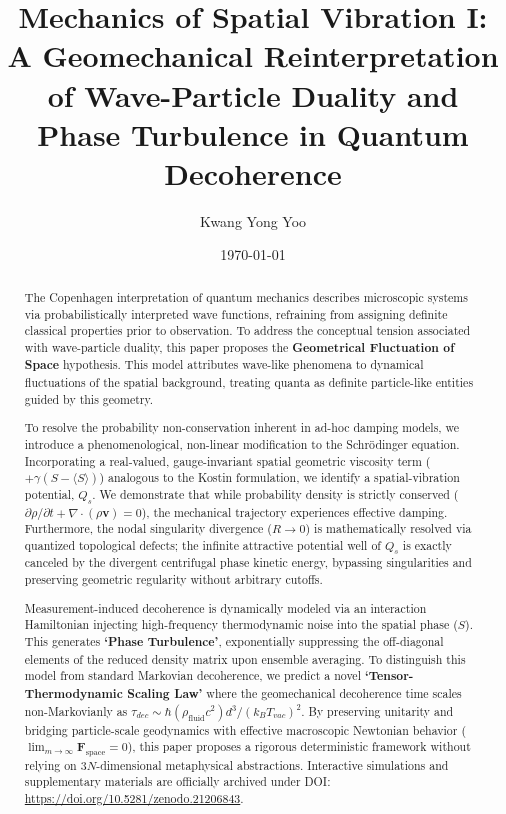 \documentclass[reprint,amsmath,amssymb,aps,prd]{revtex4-2}
\begin{document}

\title{Mechanics of Spatial Vibration I: A Geomechanical Reinterpretation of Wave-Particle Duality and Phase Turbulence in Quantum Decoherence}

\author{Kwang Yong Yoo}

\date{\today}

\begin{abstract}
The Copenhagen interpretation of quantum mechanics describes microscopic systems via probabilistically interpreted wave functions, refraining from assigning definite classical properties prior to observation. To address the conceptual tension associated with wave-particle duality, this paper proposes the \textbf{Geometrical Fluctuation of Space} hypothesis. This model attributes wave-like phenomena to dynamical fluctuations of the spatial background, treating quanta as definite particle-like entities guided by this geometry. 

To resolve the probability non-conservation inherent in ad-hoc damping models, we introduce a phenomenological, non-linear modification to the Schr\"{o}dinger equation. Incorporating a real-valued, gauge-invariant spatial geometric viscosity term ($+\gamma(S - \langle S \rangle)$) analogous to the Kostin formulation, we identify a spatial-vibration potential, $Q_s$. We demonstrate that while probability density is strictly conserved ($\partial\rho/\partial t + \nabla\cdot(\rho\mathbf{v})=0$), the mechanical trajectory experiences effective damping. Furthermore, the nodal singularity divergence ($R \to 0$) is mathematically resolved via quantized topological defects; the infinite attractive potential well of $Q_s$ is exactly canceled by the divergent centrifugal phase kinetic energy, bypassing singularities and preserving geometric regularity without arbitrary cutoffs.

Measurement-induced decoherence is dynamically modeled via an interaction Hamiltonian injecting high-frequency thermodynamic noise into the spatial phase ($S$). This generates \textbf{`Phase Turbulence'}, exponentially suppressing the off-diagonal elements of the reduced density matrix upon ensemble averaging. To distinguish this model from standard Markovian decoherence, we predict a novel \textbf{`Tensor-Thermodynamic Scaling Law'} where the geomechanical decoherence time scales non-Markovianly as $\tau_{dec} \sim \hbar (\rho_{\mathrm{fluid}} c^2) d^3 / (k_B T_{vac})^2$. By preserving unitarity and bridging particle-scale geodynamics with effective macroscopic Newtonian behavior ($\lim_{m \to \infty} \mathbf{F}_{\mathrm{space}} = 0$), this paper proposes a rigorous deterministic framework without relying on $3N$-dimensional metaphysical abstractions. Interactive simulations and supplementary materials are officially archived under DOI: \url{https://doi.org/10.5281/zenodo.21206843}.
\end{abstract}
\end{document}
